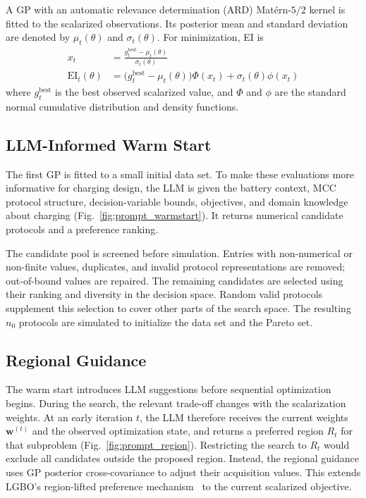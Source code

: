 \documentclass[journal]{IEEEtran}
\begin{document}
A GP with an automatic relevance determination (ARD) Mat\'ern-$5/2$ kernel is
fitted to the scalarized observations. Its posterior mean and standard
deviation are denoted by $\mu_t(\theta)$ and $\sigma_t(\theta)$. For
minimization, EI is
\begin{align}
 x_t&=\frac{g_t^{\mathrm{best}}-\mu_t(\theta)}{\sigma_t(\theta)}\\
 \mathrm{EI}_t(\theta)
 &=\bigl(g_t^{\mathrm{best}}-\mu_t(\theta)\bigr)\Phi(x_t)
 +\sigma_t(\theta)\phi(x_t)
 \label{eq:ei}
\end{align}
where $g_t^{\mathrm{best}}$ is the best observed scalarized value, and
$\Phi$ and $\phi$ are the standard normal cumulative distribution and density
functions.

\subsection{LLM-Informed Warm Start}
\label{sec:warm_start}

The first GP is fitted to a small initial data set. To make these evaluations
more informative for charging design, the LLM is given the battery context,
MCC protocol structure, decision-variable bounds, objectives, and domain
knowledge about charging (Fig.~\ref{fig:prompt_warmstart}). It returns
numerical candidate protocols and a preference ranking.

The candidate pool is screened before simulation. Entries with non-numerical
or non-finite values, duplicates, and invalid protocol representations are
removed; out-of-bound values are repaired. The remaining candidates are
selected using their ranking and diversity in the decision space. Random
valid protocols supplement this selection to cover other parts of the search
space. The resulting $n_0$ protocols are simulated to initialize the data
set and the Pareto set.

\subsection{Regional Guidance}
\label{sec:region_pref}

The warm start introduces LLM suggestions before sequential
optimization begins. During the search, the relevant trade-off changes with
the scalarization weights. At an early iteration $t$, the LLM therefore receives the current
weights $\mathbf w^{(t)}$ and the observed optimization state, and returns a
preferred region $R_t$ for that subproblem
(Fig.~\ref{fig:prompt_region}). Restricting the search to $R_t$
would exclude all candidates outside the proposed region. Instead, the regional
guidance uses GP posterior cross-covariance to adjust their acquisition values. This
extends LGBO's region-lifted preference mechanism~\cite{ref5} to the current
scalarized objective.
\end{document}
